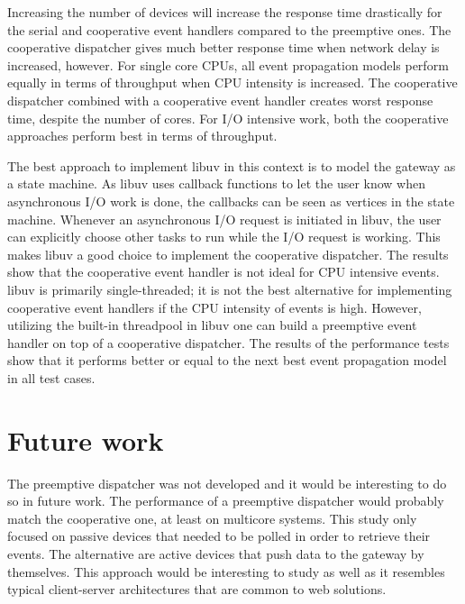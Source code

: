 Increasing the number of devices will increase the response time drastically
for the serial and cooperative event handlers compared to the preemptive ones.
The cooperative dispatcher gives much better response time when network delay
is increased, however. For single core CPUs, all event propagation models
perform equally in terms of throughput when CPU intensity is increased. The
cooperative dispatcher combined with a cooperative event handler creates worst
response time, despite the number of cores. For I/O intensive work, both the
cooperative approaches perform best in terms of throughput.

The best approach to implement libuv in this context is to model the gateway as
a state machine. As libuv uses callback functions to let the user know when
asynchronous I/O work is done, the callbacks can be seen as vertices in the
state machine. Whenever an asynchronous I/O request is initiated in libuv, the
user can explicitly choose other tasks to run while the I/O request is working.
This makes libuv a good choice to implement the cooperative dispatcher. The
results show that the cooperative event handler is not ideal for CPU intensive
events. libuv is primarily single-threaded; it is not the best alternative for
implementing cooperative event handlers if the CPU intensity of events is high.
However, utilizing the built-in threadpool in libuv one can build a preemptive
event handler on top of a cooperative dispatcher. The results of the
performance tests show that it performs better or equal to the next best event
propagation model in all test cases.

\section{Future work}

The preemptive dispatcher was not developed and it would be interesting to do
so in future work. The performance of a preemptive dispatcher would probably
match the cooperative one, at least on multicore systems. This study only
focused on passive devices that needed to be polled in order to retrieve their
events. The alternative are active devices that push data to the gateway by
themselves. This approach would be interesting to study as well as it resembles
typical client-server architectures that are common to web solutions.
